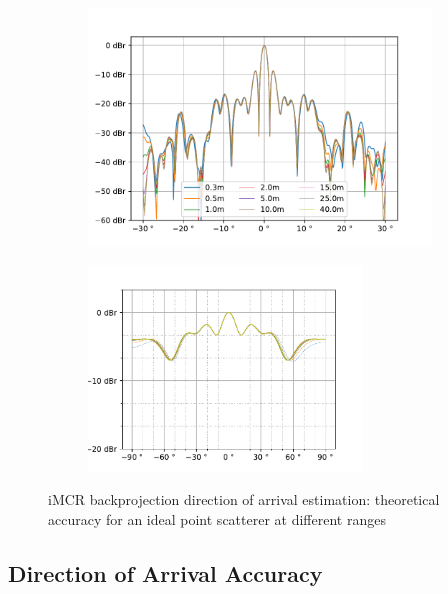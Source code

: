 \begin{figure}[h]
    \centering
    \begin{subfigure}[t]{\textwidth}
        \centering
        \includegraphics[width=\textwidth]{../figures/bp_azm_peak.pdf}
        \label{fig:bp_azm_peak}
    \end{subfigure}

    \begin{subfigure}[position]{\textwidth}
        \centering
        \includegraphics[width=0.8\textwidth]{../figures/bp_elv_peak.pdf}
        \label{fig:bp_elv_peak}
    \end{subfigure}

    \caption{iMCR backprojection direction of arrival estimation: theoretical accuracy for an ideal point scatterer at different ranges}
\end{figure}
\subsection{Direction of Arrival Accuracy}

